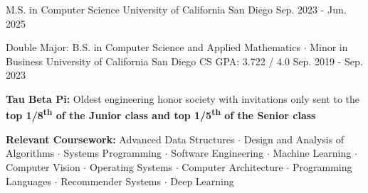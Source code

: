 

\begin{cventries}

  \cventry
    {M.S. in Computer Science} %
    {University of California San Diego} %
    {} %
    {Sep. 2023 - Jun. 2025} %
    {}
    \vspace{-\baselineskip}

  \cventry
    {Double Major: B.S. in Computer Science and Applied Mathematics $\cdot$ Minor in Business} %
    {University of California San Diego} %
    {CS GPA: 3.722 / 4.0} %
    {Sep. 2019 - Sep. 2023} %
    {
      \begin{cvitems} %
        \item {\textbf{Tau Beta Pi:} Oldest engineering honor society with invitations only sent to the \textbf{top 1/8\textsuperscript{th} of the Junior class and top 1/5\textsuperscript{th} of the Senior class}}
        \item {\textbf{Relevant Coursework:} Advanced Data Structures $\cdot$ Design and Analysis of Algorithms $\cdot$ Systems Programming $\cdot$ Software Engineering $\cdot$ Machine Learning $\cdot$ Computer Vision $\cdot$ Operating Systems $\cdot$ Computer Architecture $\cdot$ Programming Languages $\cdot$ Recommender Systems $\cdot$ Deep Learning}
      \end{cvitems}
    }

\end{cventries}
